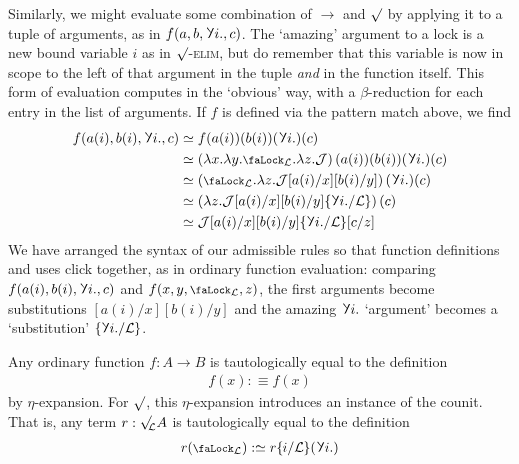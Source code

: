 \documentclass[10pt]{article}
\theoremstyle{definition}
\let\oldequiv\equiv%
\renewcommand{\equiv}{\simeq}
\newcommand{\defeq}{\oldequiv}
\newcommand{\rulen}[1]{\textsc{#1}}
\newcommand{\judge}{\mathcal{J}}
\newcommand{\lock}{\mathchoice {\scalebox{0.8}{\text{\faLock}}}
  {\scalebox{0.8}{\text{\faLock}}} {\scalebox{0.5}{\text{\faLock}}}
  {\scalebox{0.4}{\text{\faLock}}} }
\newcommand{\rbindsym}{%
  \mathchoice
    {\reflectbox{\rotatebox[origin=c]{185}{$\lambda$}}}  %
    {\reflectbox{\rotatebox[origin=c]{185}{$\lambda$}}}  %
    {\reflectbox{\rotatebox[origin=c]{185}{$\scriptstyle\lambda$}}}  %
    {\reflectbox{\rotatebox[origin=c]{185}{$\scriptscriptstyle\lambda$}}}  %
  }
\newcommand{\rbind}[1]{\rbindsym{} #1.}
\newcommand{\lockn}[1]{\mathcal{#1}}
\newcommand{\ctxlocke}[1]{\lock_{#1}}
\newcommand{\ctxlock}[1]{\ctxlocke{\lockn{#1}}}
\newcommand{\admbra}[1]{\{\mkern-1mu #1 \mkern-0.5mu\}}
\newcommand{\subkeysep}[2]{#1/#2}
\newcommand{\subkeyo}[2]{\subkeysep{#1}{\lockn{#2}}}
\newcommand{\subkey}[2]{\admbra{\subkeyo{#1}{#2}}}
\newcommand{\sublock}[2]{\admbra{\rbindsym{} #1. /\lockn{#2} }}
\newcommand{\rformsym}{\surd}
\newcommand{\rforme}[2]{\ThisStyle{\raisebox{0.07em}{$\SavedStyle \rformsym_{\hspace{-0.25em}#1}$}} #2}
\newcommand{\rform}[2]{\rforme{\lockn{#1}}{#2}}
\newcommand{\rintroe}[2]{\lock_{#1}. #2}
\newcommand{\rintro}[2]{\rintroe{\lockn{#1}}{#2}}
\begin{document}
Similarly, we might evaluate some combination of $\to$ and $\rformsym$
by applying it to a tuple of arguments, as in $f(a, b, \rbind{i}, c)$.
The `amazing' argument to a lock is a new bound variable $i$ as in
\rulen{$\rformsym$-elim}, but do remember that this variable is now in
scope to the left of that argument in the tuple \emph{and} in the
function itself. This form of evaluation computes in the `obvious'
way, with a $\beta$-reduction for each entry in the list of arguments.
If $f$ is defined via the pattern match above, we find
\begin{align*}
  f(a(i), b(i), \rbind{i}, c)
   &\defeq f(a(i))(b(i))(\rbind{i})(c) \\
   &\defeq \left( \lambda x. \lambda y. \rintro{L}{\lambda z. \judge} \right)(a(i))(b(i))(\rbind{i})(c) \\
   &\defeq \left( \rintro{L}{\lambda z. \judge[a(i)/x][b(i)/y]} \right)(\rbind{i})(c) \\
   &\defeq \left( \lambda z. \judge[a(i)/x][b(i)/y]\sublock{i}{L} \right)(c) \\
   &\defeq \judge[a(i)/x][b(i)/y]\sublock{i}{L}[c/z]
\end{align*}
We have arranged the syntax of our admissible rules so that function
definitions and uses click together, as in ordinary function
evaluation: comparing $f(a(i), b(i), \rbind{i}, c)$ and
$f(x,y,\ctxlock{L},z)$, the first arguments become substitutions
$[a(i)/x][b(i)/y]$ and the amazing $\rbind{i}$ `argument' becomes a
`substitution' $\sublock{i}{L}$.

Any ordinary function $f : A \to B$ is tautologically equal to the definition
\begin{align*}
  f(x) :\defeq f(x)
\end{align*}
by $\eta$-expansion. For $\rformsym$, this $\eta$-expansion introduces
an instance of the counit. That is, any term $r : \rform{L}{A}$ is
tautologically equal to the definition
\begin{align*}
  r(\ctxlock{L}) :\defeq r\subkey{i}{L}(\rbind{i})
\end{align*}
\end{document}
